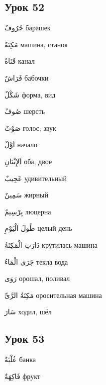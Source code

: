 \documentclass[a5paper]{article}
\newcommand\textstyleDropCaps[1]{#1}
\newcommand\textstyleCaptioncharacters[1]{#1}
\begin{document}
\subsection[Урок 52‎]{\textstyleDropCaps{Урок 52‎}}
\textstyleCaptioncharacters{خَرُوفٌ }\textstyleDropCaps{барашек‎}

\textstyleCaptioncharacters{مَكِنَةٌ }\textstyleDropCaps{машина, станок‎}

\textstyleCaptioncharacters{قَنَاةٌ }\textstyleDropCaps{канал‎}

\textstyleCaptioncharacters{فَرَاشٌ }\textstyleDropCaps{бабочки‎}

\textstyleCaptioncharacters{شَكْلٌ }\textstyleDropCaps{форма, вид‎}

\textstyleCaptioncharacters{صُوفٌ }\textstyleDropCaps{шерсть‎}

\textstyleCaptioncharacters{صَوْتٌ }\textstyleDropCaps{голос; звук‎}

\textstyleCaptioncharacters{اَوَّلٌ }\textstyleDropCaps{начало‎}

\textstyleCaptioncharacters{اَلإِثْنَانِ }\textstyleDropCaps{оба, двое‎}

\textstyleCaptioncharacters{عَجِيبٌ }\textstyleDropCaps{удивительный‎}

\textstyleCaptioncharacters{سَمِينٌ }\textstyleDropCaps{жирный‎}

\textstyleCaptioncharacters{بِرْسِيمٌ }\textstyleDropCaps{люцерна‎}

\textstyleCaptioncharacters{طُولَ الْيَوْمِ }\textstyleDropCaps{целый день‎}

\textstyleCaptioncharacters{دَارَتِ الْمَكِنَةُ }\textstyleDropCaps{крутилась машина‎}

\textstyleCaptioncharacters{جَرَى الْمَاءُ }\textstyleDropCaps{текла вода‎}

\textstyleCaptioncharacters{رَوَى }\textstyleDropCaps{орошал, поливал‎}

\textstyleCaptioncharacters{مَكِنَةُ الرَّىِّ }\textstyleDropCaps{ороситель­ная машина‎}

\textstyleCaptioncharacters{سَارَ }\textstyleDropCaps{ходил, шёл‎}

\subsection[Урок 53‎]{\textstyleDropCaps{Урок 53‎}}
\textstyleCaptioncharacters{عُلْبَةٌ }\textstyleDropCaps{банка‎}

\textstyleCaptioncharacters{فَاكِهَةٌ }\textstyleDropCaps{фрукт‎}
\end{document}

